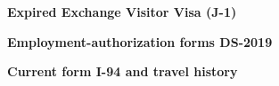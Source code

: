 \vspace*{\fill}
\begin{center}
	
	{\LARGE \bf
		Expired Exchange Visitor Visa (J-1)
	}
	
\end{center}
\vspace*{\fill}
\newpage


\vspace*{\fill}
\begin{center}
	
	{\LARGE \bf
      Employment-authorization forms DS-2019
	}
	
\end{center}
\vspace*{\fill}
\newpage


\vspace*{\fill}
\begin{center}
	
	{\LARGE \bf
		Current form I-94 and travel history
	}
	
\end{center}
\vspace*{\fill}
\newpage
